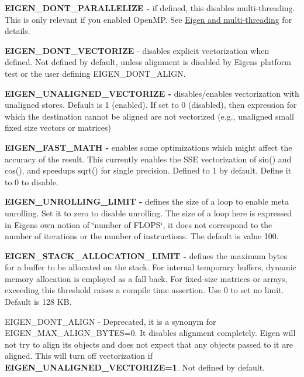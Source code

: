 \begin{DoxyItemize}
\item {\bfseries {\ttfamily E\+I\+G\+E\+N\+\_\+\+D\+O\+N\+T\+\_\+\+P\+A\+R\+A\+L\+L\+E\+L\+I\+ZE} -\/} if defined, this disables multi-\/threading. This is only relevant if you enabled Open\+MP. See \hyperlink{TopicMultiThreading}{Eigen and multi-\/threading} for details.
\item {\bfseries E\+I\+G\+E\+N\+\_\+\+D\+O\+N\+T\+\_\+\+V\+E\+C\+T\+O\+R\+I\+ZE} -\/ disables explicit vectorization when defined. Not defined by default, unless alignment is disabled by Eigen\textquotesingle{}s platform test or the user defining {\ttfamily E\+I\+G\+E\+N\+\_\+\+D\+O\+N\+T\+\_\+\+A\+L\+I\+GN}.
\item {\bfseries {\ttfamily E\+I\+G\+E\+N\+\_\+\+U\+N\+A\+L\+I\+G\+N\+E\+D\+\_\+\+V\+E\+C\+T\+O\+R\+I\+ZE} -\/} disables/enables vectorization with unaligned stores. Default is 1 (enabled). If set to 0 (disabled), then expression for which the destination cannot be aligned are not vectorized (e.\+g., unaligned small fixed size vectors or matrices)
\item {\bfseries {\ttfamily E\+I\+G\+E\+N\+\_\+\+F\+A\+S\+T\+\_\+\+M\+A\+TH} -\/} enables some optimizations which might affect the accuracy of the result. This currently enables the S\+SE vectorization of sin() and cos(), and speedups sqrt() for single precision. Defined to 1 by default. Define it to 0 to disable.
\item {\bfseries {\ttfamily E\+I\+G\+E\+N\+\_\+\+U\+N\+R\+O\+L\+L\+I\+N\+G\+\_\+\+L\+I\+M\+IT} -\/} defines the size of a loop to enable meta unrolling. Set it to zero to disable unrolling. The size of a loop here is expressed in Eigen\textquotesingle{}s own notion of \char`\"{}number of F\+L\+O\+P\+S\char`\"{}, it does not correspond to the number of iterations or the number of instructions. The default is value 100.
\item {\bfseries {\ttfamily E\+I\+G\+E\+N\+\_\+\+S\+T\+A\+C\+K\+\_\+\+A\+L\+L\+O\+C\+A\+T\+I\+O\+N\+\_\+\+L\+I\+M\+IT} -\/} defines the maximum bytes for a buffer to be allocated on the stack. For internal temporary buffers, dynamic memory allocation is employed as a fall back. For fixed-\/size matrices or arrays, exceeding this threshold raises a compile time assertion. Use 0 to set no limit. Default is 128 KB.
\item {\ttfamily E\+I\+G\+E\+N\+\_\+\+D\+O\+N\+T\+\_\+\+A\+L\+I\+GN} -\/ Deprecated, it is a synonym for {\ttfamily E\+I\+G\+E\+N\+\_\+\+M\+A\+X\+\_\+\+A\+L\+I\+G\+N\+\_\+\+B\+Y\+T\+ES=0}. It disables alignment completely. Eigen will not try to align its objects and does not expect that any objects passed to it are aligned. This will turn off vectorization if {\bfseries E\+I\+G\+E\+N\+\_\+\+U\+N\+A\+L\+I\+G\+N\+E\+D\+\_\+\+V\+E\+C\+T\+O\+R\+I\+ZE=1}. Not defined by default.

\end{DoxyItemize}
